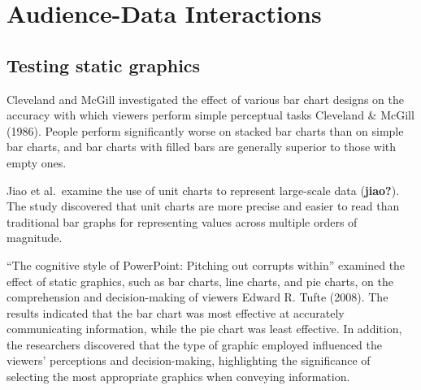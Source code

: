 \documentclass[print]{nuthesis}
\begin{document}
\hypertarget{audience-data-interactions}{%
\section{Audience-Data Interactions}\label{audience-data-interactions}}


\hypertarget{testing-static-graphics}{%
\subsection{Testing static graphics}\label{testing-static-graphics}}

Cleveland and McGill investigated the effect of various bar chart designs on the accuracy with which viewers perform simple perceptual tasks Cleveland \& McGill (1986).
People perform significantly worse on stacked bar charts than on simple bar charts, and bar charts with filled bars are generally superior to those with empty ones.

Jiao et al.~examine the use of unit charts to represent large-scale data (\textbf{jiao?}).
The study discovered that unit charts are more precise and easier to read than traditional bar graphs for representing values across multiple orders of magnitude.

``The cognitive style of PowerPoint: Pitching out corrupts within'' examined the effect of static graphics, such as bar charts, line charts, and pie charts, on the comprehension and decision-making of viewers Edward R. Tufte (2008).
The results indicated that the bar chart was most effective at accurately communicating information, while the pie chart was least effective.
In addition, the researchers discovered that the type of graphic employed influenced the viewers' perceptions and decision-making, highlighting the significance of selecting the most appropriate graphics when conveying information.
\end{document}

